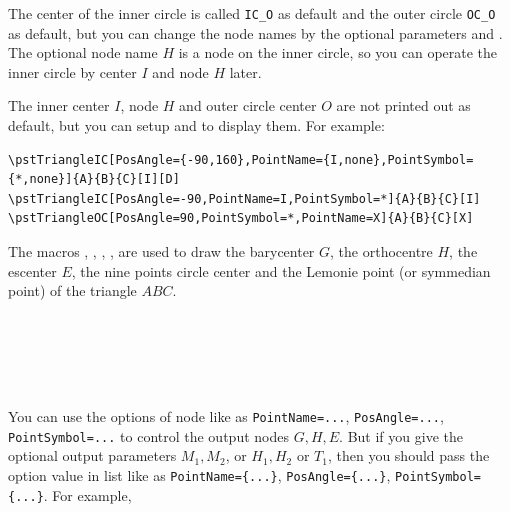 \documentclass[11pt,english,BCOR=10mm,DIV=12,bibliography=totoc,parskip=false,headings=small,
    headinclude=false,footinclude=false,twoside,english]{pst-doc}
\begin{document}
The center of the inner circle is called \verb|IC_O| as default and the outer circle \verb|OC_O| as default,
but you can change the node names by the optional parameters   and .
The optional node name $H$ is a node on the inner circle,
so you can operate the inner circle by center $I$ and node $H$ later.

The inner center $I$, node $H$ and outer circle center $O$ are not printed out as default,
but you can setup  and  to display them.
For example:

\begin{lstlisting}
\pstTriangleIC[PosAngle={-90,160},PointName={I,none},PointSymbol={*,none}]{A}{B}{C}[I][D]
\pstTriangleIC[PosAngle=-90,PointName=I,PointSymbol=*]{A}{B}{C}[I]
\pstTriangleOC[PosAngle=90,PointSymbol=*,PointName=X]{A}{B}{C}[X]
\end{lstlisting}

The macros , , , , 
are used to draw the barycenter $G$, the orthocentre $H$, the escenter $E$, the nine points circle center
and the Lemonie point (or symmedian point) of the triangle $ABC$.

\begin{BDef}
\OptArgs{}\\
\OptArgs{}\\
\OptArgs{}\\
\OptArgs{}\\
\OptArgs{}
\end{BDef}

You can use the options of node like as \verb|PointName=...|, \verb|PosAngle=...|, \verb|PointSymbol=...|
to control the output nodes $G,H,E$. But if you give the optional output parameters $M_1,M_2$, or $H_1,H_2$
or $T_1$, then you should pass the option value in list like as \verb|PointName={...}|,
\verb|PosAngle={...}|, \verb|PointSymbol={...}|. For example,
\end{document}
